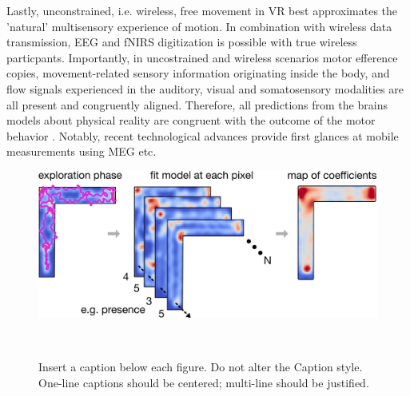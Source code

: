 Lastly, unconstrained, i.e. wireless, free movement in VR best approximates the 'natural' multisensory experience of motion. In combination with wireless data transmission, EEG and fNIRS digitization is possible with true wireless particpants. Importantly, in uncostrained and wireless scenarios motor efference copies, movement-related sensory information originating inside the body, and flow signals experienced in the auditory, visual and somatosensory modalities are all present and congruently aligned. Therefore, all predictions from the brains models about physical reality are congruent with the outcome of the motor behavior \cite{}. %
Notably, recent technological advances provide first glances at mobile measurements using MEG etc. %

\begin{figure}[!t]
\centering
  \includegraphics[width=\linewidth]{figures/methods.pdf}
  \caption{Insert a caption below each figure. Do not alter the
    Caption style.  One-line captions should be centered; multi-line
    should be justified. }~\label{fig:methods}
\end{figure}